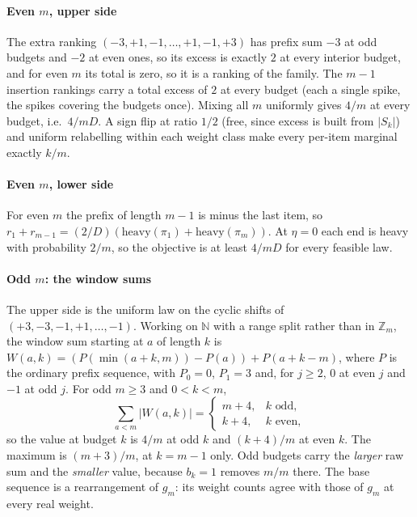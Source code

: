 \paragraph{Even $m$, upper side} The extra ranking $(-3,+1,-1,\dots,+1,-1,+3)$ has prefix
sum $-3$ at odd budgets and $-2$ at even ones, so its excess is exactly $2$ at every
interior budget, and for even $m$ its total is zero, so it is a ranking of the family. The
$m-1$ insertion rankings carry a total excess of $2$ at every budget (each a single spike,
the spikes covering the budgets once). Mixing all $m$ uniformly gives $4/m$ at every
budget, i.e.\ $4/mD$. A sign flip at ratio $1/2$ (free, since excess is built from
$|S_{k}|$) and uniform relabelling within each weight class make every per-item marginal
exactly $k/m$.


\paragraph{Even $m$, lower side} For even $m$ the prefix of length $m-1$ is minus the last
item, so $r_{1}+r_{m-1}=(2/D)(\mathrm{heavy}(\pi_{1})+\mathrm{heavy}(\pi_{m}))$. At $\eta=0$
each end is heavy with probability $2/m$, so the objective is at least $4/mD$ for every
feasible law.


\paragraph{Odd $m$: the window sums} The upper side is the uniform law on the cyclic shifts
of $(+3,-3,-1,+1,\dots,-1)$. Working on $\mathbb{N}$ with a range split rather than in
$\mathbb{Z}_{m}$, the window sum starting at $a$ of length $k$ is
$W(a,k)=(P(\min(a+k,m))-P(a))+P(a+k-m)$, where $P$ is the ordinary prefix sequence, with
$P_{0}=0$, $P_{1}=3$ and, for $j\ge2$, $0$ at even $j$ and $-1$ at odd $j$. For odd $m\ge3$
and $0<k<m$,
\[
\sum_{a<m}|W(a,k)|=\begin{cases}m+4,&k\text{ odd},\\ k+4,&k\text{ even},\end{cases}
\]
so the value at budget $k$ is $4/m$ at odd $k$ and $(k+4)/m$ at even $k$. The maximum is
$(m+3)/m$, at $k=m-1$ only. Odd budgets carry the \emph{larger} raw sum and the
\emph{smaller} value, because $b_{k}=1$ removes $m/m$ there. The base sequence is a
rearrangement of $g_{m}$: its weight counts agree with those of $g_{m}$ at every real
weight.

